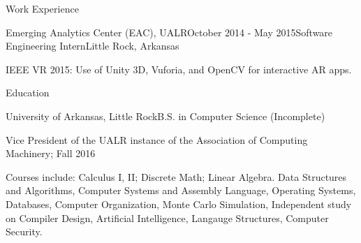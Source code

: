 \documentclass{resume} %
\begin{document}
\begin{rSection}{Work Experience}
\begin{rSubsection}{Emerging Analytics Center (EAC), UALR}{October 2014 - May 2015}{Software Engineering Intern}{Little Rock, Arkansas}
	\item IEEE VR 2015: Use of Unity 3D, Vuforia, and OpenCV for interactive AR apps.
\end{rSubsection}


\end{rSection}


\begin{rSection}{Education}

\begin{rSubsection}{University of Arkansas, Little Rock}{}{B.S. in Computer Science (Incomplete)}

	\item Vice President of the UALR instance of the Association of Computing Machinery; Fall 2016
	\item Courses include: Calculus I, II; Discrete Math; Linear Algebra. Data Structures and Algorithms, Computer Systems and Assembly Language, Operating Systems, Databases, Computer Organization, Monte Carlo Simulation, Independent study on Compiler Design, Artificial Intelligence, Langauge Structures, Computer Security.
\end{rSubsection}


\end{rSection}
\end{document}
